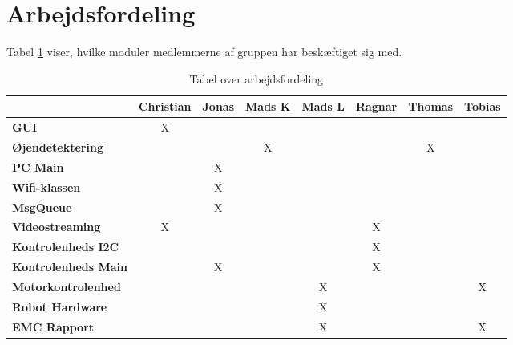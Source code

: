 \section*{Arbejdsfordeling}
Tabel \ref{ArbejdsfordelingTabel} viser, hvilke moduler medlemmerne af gruppen har beskæftiget sig med.

\begin{table}[H]
\centering
\begin{tabular}{|l|c|c|c|c|c|c|c|}
            \hline         & \textbf{Christian} & \textbf{Jonas} & \textbf{Mads K} & \textbf{Mads L} & \textbf{Ragnar} & \textbf{Thomas} & \textbf{Tobias} \\\hline
\textbf{GUI}                  & X         &       &        &        &        &        &        \\\hline
\textbf{Øjendetektering}     &           &       & X      &        &        & X      &        \\\hline
\textbf{PC Main}              &           & X     &        &        &        &        &        \\\hline
\textbf{Wifi-klassen}         &           & X     &        &        &        &        &        \\\hline
\textbf{MsgQueue}         &           & X     &        &        &        &        &        \\\hline
\textbf{Videostreaming}      & X         &       &        &        & X      &        &        \\\hline
\textbf{Kontrolenheds I2C}     &           &       &        &        & X      &        &        \\\hline
\textbf{Kontrolenheds Main}    &           & X     &        &        & X      &        &        \\\hline
\textbf{Motorkontrolenhed} &           &       &        & X      &        &        & X      \\\hline
\textbf{Robot Hardware}       &           &       &        & X      &        &        &        \\\hline
\textbf{EMC Rapport}          &           &       &        & X      &        &        & X   \\\hline  
\end{tabular}
\caption{Tabel over arbejdsfordeling}
\label{ArbejdsfordelingTabel}
\end{table}


%